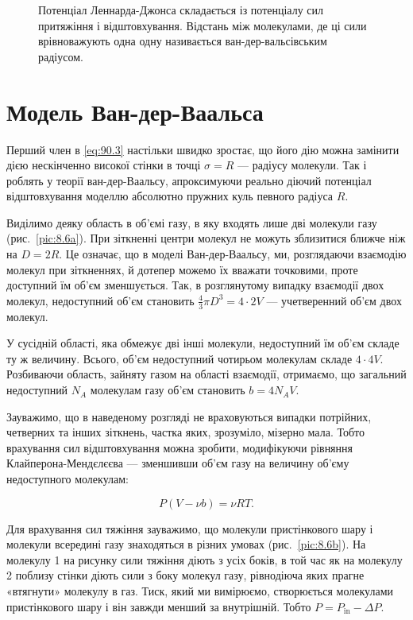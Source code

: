 \begin{figure}[h!]\centering

\caption{Потенціал Леннарда-Джонса складається із потенціалу сил притяжіння і відштовхування. Відстань між молекулами, де ці сили врівноважують одна одну називається ван-дер-вальсівським радіусом.}
\label{pic:8.5}
\end{figure}

\section{Модель Ван-дер-Ваальса}

Перший член в \eqref{eq:90.3} настільки швидко зростає, що його дію можна замінити дією нескінченно
високої стінки в точці $\sigma = R$ — радіусу молекули. Так і роблять у теорії ван-дер-Ваальсу,
апроксимуючи реально діючий потенціал відштовхування моделлю абсолютно пружних куль певного радіуса
$R$.

Виділимо деяку область в об'ємі газу, в яку входять лише дві молекули газу (рис.~\ref{pic:8.6a}). При зіткненні центри
молекул не можуть зблизитися ближче ніж на $D = 2R$. Це означає, що в моделі Ван-дер-Ваальсу, ми,
розглядаючи взаємодію молекул при зіткненнях, й дотепер можемо їх вважати точковими, проте доступний їм
об'єм зменшується. Так, в розглянутому випадку взаємодії двох молекул, недоступний об'єм становить
$\frac{4}{3}\pi D^3 = 4\cdot 2V$ --- учетверенний об'єм двох молекул.

У сусідній області, яка обмежує дві інші молекули, недоступний їм об'єм складе ту ж величину. Всього,
об'єм недоступний чотирьом молекулам складе $4\cdot4V$. Розбиваючи область, зайняту газом на області
взаємодії, отримаємо, що загальний недоступний $N_A$ молекулам газу об'єм становить $b = 4N_A V$.

Зауважимо, що в наведеному розгляді не враховуються випадки потрійних, четверних та інших зіткнень,
частка яких, зрозуміло, мізерно мала. Тобто врахування сил відштовхування можна зробити, модифікуючи
рівняння Клайперона-Мендєлєєва --- зменшивши об'єм газу на величину об'єму недоступного молекулам:

\begin{equation}
P(V - \nu b) = \nu RT.
\label{eq:91.1}
\end{equation}

Для врахування сил тяжіння зауважимо, що молекули пристінкового шару і молекули всередині газу
знаходяться в різних умовах (рис.~\ref{pic:8.6b}). На молекулу 1 на рисунку сили тяжіння діють з усіх боків, в той час як на
молекулу 2 поблизу стінки діють сили з боку молекул газу, рівнодіюча яких прагне «втягнути» молекулу в
газ. Тиск, який ми вимірюємо, створюється молекулами пристінкового шару і він завжди менший за
внутрішній. Тобто $P = P_{\text{in}} - \Delta P$.

